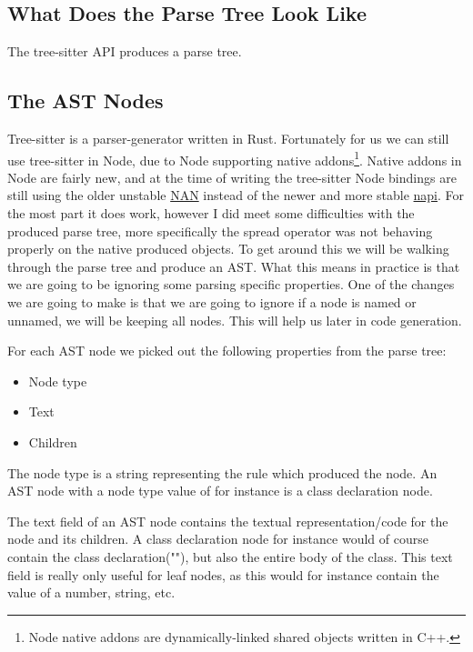 
\subsection{What Does the Parse Tree Look Like}\label{subsec:what-does-the-parse-tree-look-like}

The tree-sitter API produces a parse tree.

\subsection{The AST Nodes}\label{subsec:the-ast-nodes}

Tree-sitter is a parser-generator written in Rust.
Fortunately for us we can still use tree-sitter in Node, due to Node supporting native addons\footnote{Node native addons are dynamically-linked shared objects written in C++\cite{nodenativeaddons}.}.
Native addons in Node are fairly new, and at the time of writing the tree-sitter Node bindings are still using the older unstable \hyperref[https://github.com/nodejs/nan]{NAN} instead of the newer and more stable \hyperref[https://nodejs.org/api/n-api.html]{napi}.
For the most part it does work, however I did meet some difficulties with the produced parse tree, more specifically the spread operator was not behaving properly on the native produced objects.
To get around this we will be walking through the parse tree and produce an AST.
What this means in practice is that we are going to be ignoring some parsing specific properties.
One of the changes we are going to make is that we are going to ignore if a node is named or unnamed, we will be keeping all nodes.
This will help us later in code generation.

For each AST node we picked out the following properties from the parse tree:

\begin{itemize}
    \item Node type
    \item Text
    \item Children
\end{itemize}

The node type is a string representing the rule which produced the node.
An AST node with a node type value of  for instance is a class declaration node.

The text field of an AST node contains the textual representation/code for the node and its children.
A class declaration node for instance would of course contain the class declaration(""), but also the entire body of the class.
This text field is really only useful for leaf nodes, as this would for instance contain the value of a number, string, etc.

